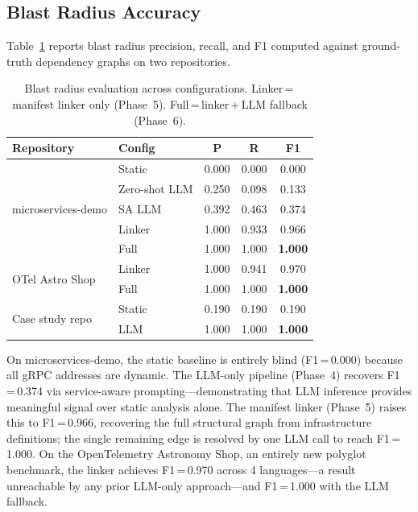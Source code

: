 \documentclass[runningheads]{llncs}
\begin{document}
\subsection{Blast Radius Accuracy}

Table~\ref{tab:blast} reports blast radius precision, recall, and F1
computed against ground-truth dependency graphs on two repositories.

\begin{table}[t]
\caption{Blast radius evaluation across configurations. Linker\,=\,manifest
  linker only (Phase~5). Full\,=\,linker\,+\,LLM fallback (Phase~6).}
\label{tab:blast}
\centering
\small
\begin{tabular}{llccc}
\toprule
Repository & Config & P & R & F1 \\
\midrule
\multirow{5}{*}{microservices-demo}
  & Static        & 0.000 & 0.000 & 0.000 \\
  & Zero-shot LLM & 0.250 & 0.098 & 0.133 \\
  & SA LLM        & 0.392 & 0.463 & 0.374 \\
  & Linker        & 1.000 & 0.933 & 0.966 \\
  & Full          & 1.000 & 1.000 & \textbf{1.000} \\
\midrule
\multirow{2}{*}{OTel Astro Shop}
  & Linker        & 1.000 & 0.941 & 0.970 \\
  & Full          & 1.000 & 1.000 & \textbf{1.000} \\
\midrule
\multirow{2}{*}{Case study repo}
  & Static        & 0.190 & 0.190 & 0.190 \\
  & LLM           & 1.000 & 1.000 & \textbf{1.000} \\
\bottomrule
\end{tabular}
\end{table}

On microservices-demo, the static baseline is entirely blind (F1\,=\,0.000)
because all gRPC addresses are dynamic. The LLM-only pipeline (Phase~4)
recovers F1\,=\,0.374 via service-aware prompting---demonstrating that LLM
inference provides meaningful signal over static analysis alone. The manifest
linker (Phase~5) raises this to F1\,=\,0.966, recovering the full
structural graph from infrastructure definitions; the single remaining edge is
resolved by one LLM call to reach F1\,=\,1.000. On the OpenTelemetry Astronomy
Shop, an entirely new polyglot benchmark, the linker achieves F1\,=\,0.970
across 4 languages---a result unreachable by any prior LLM-only approach---and
F1\,=\,1.000 with the LLM fallback.
\end{document}
